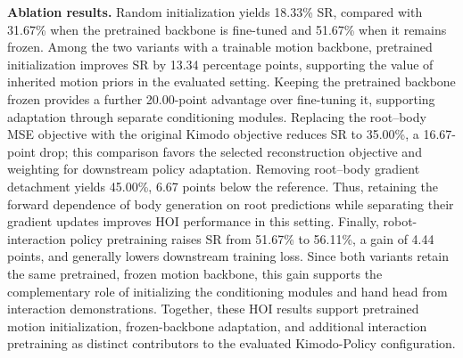 \textbf{Ablation results.} Random initialization yields 18.33\% SR, compared with 31.67\% when the pretrained backbone is fine-tuned and 51.67\% when it remains frozen. Among the two variants with a trainable motion backbone, pretrained initialization improves SR by 13.34 percentage points, supporting the value of inherited motion priors in the evaluated setting. Keeping the pretrained backbone frozen provides a further 20.00-point advantage over fine-tuning it, supporting adaptation through separate conditioning modules. Replacing the root--body MSE objective with the original Kimodo objective reduces SR to 35.00\%, a 16.67-point drop; this comparison favors the selected reconstruction objective and weighting for downstream policy adaptation. \mbox{Removing} root--body gradient detachment yields 45.00\%, 6.67 points below the reference. Thus, retaining the forward dependence of body generation on root predictions while separating their gradient updates improves HOI performance in this setting. Finally, robot-interaction policy pretraining raises SR from 51.67\% to 56.11\%, a gain of 4.44 points, and generally lowers downstream training loss. Since both variants retain the same pretrained, frozen motion backbone, this gain supports the complementary role of initializing the conditioning modules and hand head from interaction demonstrations. Together, these HOI results support pretrained motion initialization, frozen-backbone adaptation, and additional interaction pretraining as distinct contributors to the evaluated Kimodo-Policy configuration.

\endgroup
